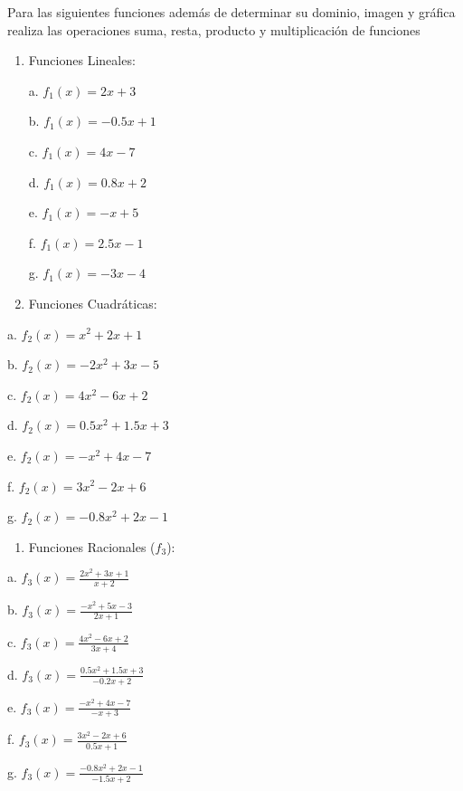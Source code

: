 \documentclass[]{book}
\providecommand{\tightlist}{%
  \setlength{\itemsep}{0pt}\setlength{\parskip}{0pt}}
\begin{document}
Para las siguientes funciones además de determinar su dominio, imagen y
gráfica realiza las operaciones suma, resta, producto y multiplicación
de funciones

\begin{enumerate}
\def\labelenumi{\arabic{enumi}.}
\tightlist
\item
  Funciones Lineales:

  \begin{multicols}{2}
  a. $f_1(x) = 2x + 3$

  b. $f_1(x) = -0.5x + 1$

  c. $f_1(x) = 4x - 7$

  d. $f_1(x) = 0.8x + 2$

  e. $f_1(x) = -x + 5$

  f. $f_1(x) = 2.5x - 1$

  g. $f_1(x) = -3x - 4$
  \end{multicols}
\item
  Funciones Cuadráticas:
\end{enumerate}

\begin{multicols}{2}
    a. $f_2(x) = x^2 + 2x + 1$
    
    b. $f_2(x) = -2x^2 + 3x - 5$
    
    c. $f_2(x) = 4x^2 - 6x + 2$
    
    d. $f_2(x) = 0.5x^2 + 1.5x + 3$
    
    e. $f_2(x) = -x^2 + 4x - 7$
    
    f. $f_2(x) = 3x^2 - 2x + 6$
    
    g. $f_2(x) = -0.8x^2 + 2x - 1$
\end{multicols}

\begin{enumerate}
\def\labelenumi{\arabic{enumi}.}
\setcounter{enumi}{2}
\tightlist
\item
  Funciones Racionales (\(f_3\)):
\end{enumerate}

\begin{multicols}{2}
    a. $f_3(x) = \frac{2x^2 + 3x + 1}{x + 2}$
    
    b. $f_3(x) = \frac{-x^2 + 5x - 3}{2x + 1}$
    
    c. $f_3(x) = \frac{4x^2 - 6x + 2}{3x + 4}$
    
    d. $f_3(x) = \frac{0.5x^2 + 1.5x + 3}{-0.2x + 2}$
    
    e. $f_3(x) = \frac{-x^2 + 4x - 7}{-x + 3}$
    
    f. $f_3(x) = \frac{3x^2 - 2x + 6}{0.5x + 1}$
    
    g. $f_3(x) = \frac{-0.8x^2 + 2x - 1}{-1.5x + 2}$
\end{multicols}
\end{document}
